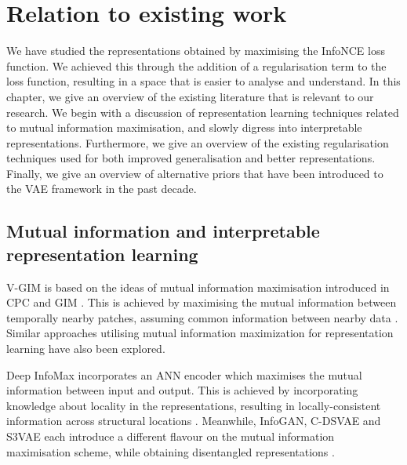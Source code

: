 
\chapter{Relation to existing work}

We have studied the representations obtained by maximising the InfoNCE loss function. We achieved this through the addition of a regularisation term to the loss function, resulting in a space that is easier to analyse and understand. In this chapter, we give an overview of the existing literature that is relevant to our research. We begin with a discussion of representation learning techniques related to mutual information maximisation, and slowly digress into interpretable representations. Furthermore, we give an overview of the existing regularisation techniques used for both improved generalisation and better representations. Finally, we give an overview of alternative priors that have been introduced to the VAE framework in the past decade.


\section{Mutual information and interpretable representation learning}

	V-GIM is based on the ideas of mutual information maximisation introduced in CPC and GIM \citep{lowePuttingEndEndtoEnd2020, oordRepresentationLearningContrastive2019}. This is achieved by maximising the mutual information between temporally nearby patches, assuming common information between nearby data \citep{lowePuttingEndEndtoEnd2020}. Similar approaches utilising mutual information maximization for representation learning have also been explored.
	
	Deep InfoMax incorporates an ANN encoder which maximises the mutual information between input and output. This is achieved by incorporating knowledge about locality in the representations, resulting in locally-consistent information across structural locations \citep{hjelmLearningDeepRepresentations2019}. Meanwhile, InfoGAN, C-DSVAE and S3VAE each introduce a different flavour on the mutual information maximisation scheme, while obtaining disentangled representations \citep{chenInfoGANInterpretableRepresentation2016, baiContrastivelyDisentangledSequential2021, zhuS3VAESelfSupervisedSequential2020}. 
	
